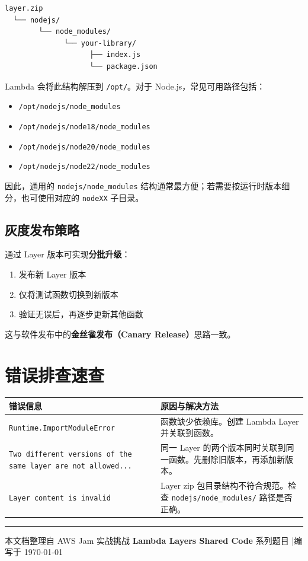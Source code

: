 \documentclass[12pt, a4paper]{article}
\begin{document}
\begin{lstlisting}
layer.zip
  └── nodejs/
        └── node_modules/
              └── your-library/
                    ├── index.js
                    └── package.json
\end{lstlisting}

Lambda 会将此结构解压到 \texttt{/opt/}。对于 Node.js，常见可用路径包括：

\begin{itemize}
  \item \texttt{/opt/nodejs/node\_modules}
  \item \texttt{/opt/nodejs/node18/node\_modules}
  \item \texttt{/opt/nodejs/node20/node\_modules}
  \item \texttt{/opt/nodejs/node22/node\_modules}
\end{itemize}

因此，通用的 \texttt{nodejs/node\_modules} 结构通常最方便；若需要按运行时版本细分，也可使用对应的 \texttt{nodeXX} 子目录。

\subsection{灰度发布策略}

通过 Layer 版本可实现\textbf{分批升级}：

\begin{enumerate}
  \item 发布新 Layer 版本
  \item 仅将测试函数切换到新版本
  \item 验证无误后，再逐步更新其他函数
\end{enumerate}

这与软件发布中的\textbf{金丝雀发布（Canary Release）}思路一致。

\section{错误排查速查}

\begin{center}
\begin{tabular}{p{5.5cm} p{7.5cm}}
\toprule
\textbf{错误信息} & \textbf{原因与解决方法} \\
\midrule
\texttt{Runtime.ImportModuleError} & 函数缺少依赖库。创建 Lambda Layer 并关联到函数。 \\
\addlinespace
\texttt{Two different versions of the same layer are not allowed...} & 同一 Layer 的两个版本同时关联到同一函数。先删除旧版本，再添加新版本。 \\
\addlinespace
\texttt{Layer content is invalid} & Layer zip 包目录结构不符合规范。检查 \texttt{nodejs/node\_modules/} 路径是否正确。 \\
\bottomrule
\end{tabular}
\end{center}

\vspace{2em}
\hrule
\vspace{0.5em}
\begin{center}
\small\color{gray}
本文档整理自 AWS Jam 实战挑战 \textbf{Lambda Layers Shared Code} 系列题目 \quad|\quad 编写于 \today
\end{center}
\end{document}
